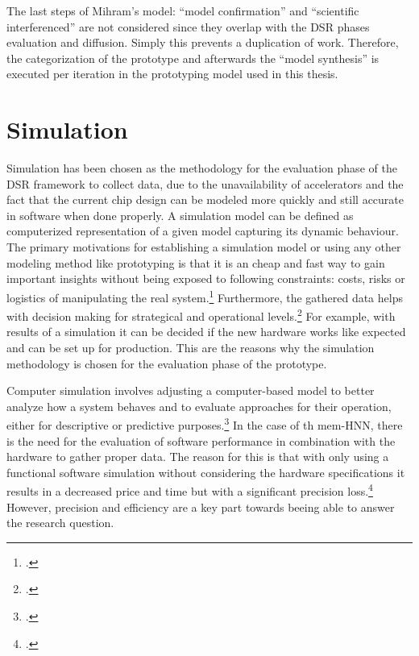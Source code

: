 The last steps of Mihram's model: ``model confirmation'' and ``scientific interferenced'' are not considered since they overlap with the \ac{DSR} phases evaluation and diffusion. 
Simply this prevents a duplication of work.
Therefore, the categorization of the prototype and afterwards the ``model synthesis'' is executed per iteration in the prototyping model used in this thesis. 

\section{Simulation}

Simulation has been chosen as the methodology for the evaluation phase of the \ac{DSR} framework to collect data, due to the unavailability
of accelerators and the fact that the current chip design can be modeled more quickly and still accurate in software when done properly.
A simulation model can be defined as computerized representation of a given model capturing its dynamic behaviour.
The primary motivations for establishing a simulation model or using any other modeling method like prototyping is that it is
an cheap and fast way to gain important insights without being exposed to following constraints: costs, risks or logistics of manipulating the real system.\footcite[cf.][92]{kellnerSoftwareProcessSimulation1999}
Furthermore, the gathered data helps with decision making for strategical and operational levels.\footcite[cf.][93]{kellnerSoftwareProcessSimulation1999}
For example, with results of a simulation it can be decided if the new hardware works like expected and can be set up for production.
This are the reasons why the simulation methodology is chosen for the evaluation phase of the prototype. 

Computer simulation involves adjusting a computer-based model to better analyze how a system behaves and to evaluate approaches for their operation, either for descriptive or predictive purposes.\footcite[cf.][13-14]{abarAgentBasedModelling2017}
In the case of th \ac{mem-HNN}, there is the need for the evaluation of software performance in combination with the hardware to gather proper data.
The reason for this is that with only using a functional software simulation without considering the hardware specifications it results in a decreased price and time but with a significant precision loss.\footcite[cf.][470-471]{sarhadiStateArtHardware2015}
However, precision and efficiency are a key part towards beeing able to answer the research question.

